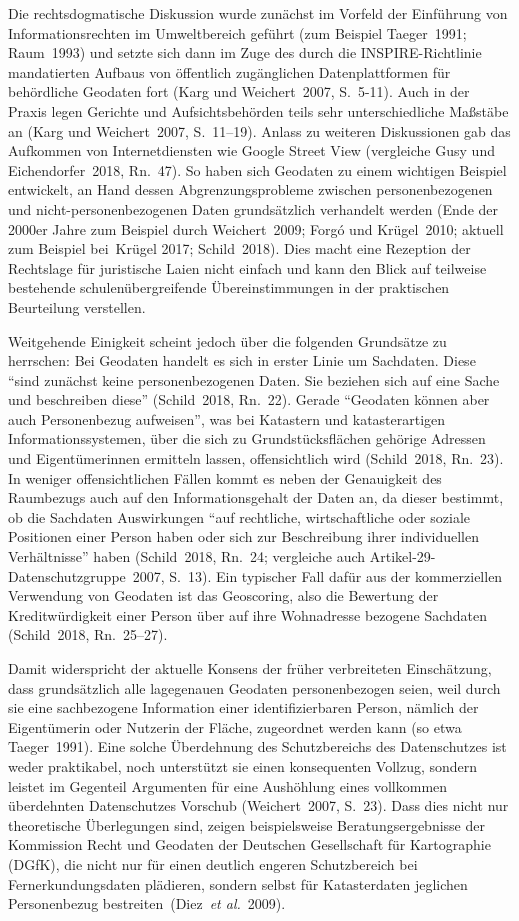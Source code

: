 \documentclass[a4paper,
fontsize=11pt,
oneside,
numbers=noperiodatend,
parskip=half-,
bibliography=totoc,
final
]{scrartcl}
\begin{document}
Die rechtsdogmatische Diskussion wurde zunächst im Vorfeld der
Einführung von Informationsrechten im Umweltbereich geführt (zum
Beispiel Taeger~1991; Raum~1993) und setzte sich dann im Zuge des durch
die INSPIRE-Richtlinie mandatierten Aufbaus von öffentlich zugänglichen
Datenplattformen für behördliche Geodaten fort (Karg und Weichert~2007,
S.~5-11). Auch in der Praxis legen Gerichte und Aufsichtsbehörden teils
sehr unterschiedliche Maßstäbe an (Karg und Weichert~2007, S.~11--19).
Anlass zu weiteren Diskussionen gab das Aufkommen von Internetdiensten
wie Google Street View (vergleiche Gusy und Eichendorfer~2018, Rn.~47).
So haben sich Geodaten zu einem wichtigen Beispiel entwickelt, an Hand
dessen Abgrenzungsprobleme zwischen personenbezogenen und
nicht-personenbezogenen Daten grundsätzlich verhandelt werden (Ende der
2000er Jahre zum Beispiel durch Weichert~2009; Forgó und Krügel~2010;
aktuell zum Beispiel bei~Krügel 2017; Schild~2018). Dies macht eine
Rezeption der Rechtslage für juristische Laien nicht einfach und kann
den Blick auf teilweise bestehende schulenübergreifende
Übereinstimmungen in der praktischen Beurteilung verstellen.

Weitgehende Einigkeit scheint jedoch über die folgenden Grundsätze zu
herrschen: Bei Geodaten handelt es sich in erster Linie um Sachdaten.
Diese \enquote{sind zunächst keine personenbezogenen Daten. Sie beziehen
sich auf eine Sache und beschreiben diese} (Schild~2018, Rn.~22). Gerade
\enquote{Geodaten können aber auch Personenbezug aufweisen}, was bei
Katastern und katasterartigen Informationssystemen, über die sich zu
Grundstücksflächen gehörige Adressen und Eigentümerinnen ermitteln
lassen, offensichtlich wird (Schild~2018, Rn.~23). In weniger
offensichtlichen Fällen kommt es neben der Genauigkeit des Raumbezugs
auch auf den Informationsgehalt der Daten an, da dieser bestimmt, ob die
Sachdaten Auswirkungen \enquote{auf rechtliche, wirtschaftliche oder
soziale Positionen einer Person haben oder sich zur Beschreibung ihrer
individuellen Verhältnisse} haben (Schild~2018, Rn.~24; vergleiche auch
Artikel-29-Datenschutzgruppe~2007, S.~13). Ein typischer Fall dafür aus
der kommerziellen Verwendung von Geodaten ist das Geoscoring, also die
Bewertung der Kreditwürdigkeit einer Person über auf ihre Wohnadresse
bezogene Sachdaten (Schild~2018, Rn.~25--27).

Damit widerspricht der aktuelle Konsens der früher verbreiteten
Einschätzung, dass grundsätzlich alle lagegenauen Geodaten
personenbezogen seien, weil durch sie eine sachbezogene Information
einer identifizierbaren Person, nämlich der Eigentümerin oder Nutzerin
der Fläche, zugeordnet werden kann (so etwa Taeger~1991). Eine solche
Überdehnung des Schutzbereichs des Datenschutzes ist weder praktikabel,
noch unterstützt sie einen konsequenten Vollzug, sondern leistet im
Gegenteil Argumenten für eine Aushöhlung eines vollkommen überdehnten
Datenschutzes Vorschub (Weichert~2007, S.~23). Dass dies nicht nur
theoretische Überlegungen sind, zeigen beispielsweise
Beratungsergebnisse der Kommission Recht und Geodaten der Deutschen
Gesellschaft für Kartographie (DGfK), die nicht nur für einen deutlich
engeren Schutzbereich bei Fernerkundungsdaten plädieren, sondern selbst
für Katasterdaten jeglichen Personenbezug bestreiten~(Diez~\emph{et
al.}~2009).
\end{document}
